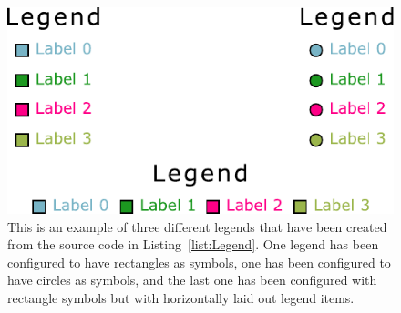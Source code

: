 \begin{figure}[tp]
  \centering
  \includegraphics[keepaspectratio,width=\linewidth / 2,height=\fullh]{diagrams/legend.pdf}
  \caption[Legend Example]{
    This is an example of three different legends that have been created from the source code in Listing~\ref{list:Legend}.
    One legend has been configured to have rectangles as symbols, one has been configured to have circles as symbols, and the last one has been configured with rectangle symbols but with horizontally laid out legend items.
  }
  \label{fig:Legend}
\end{figure}

